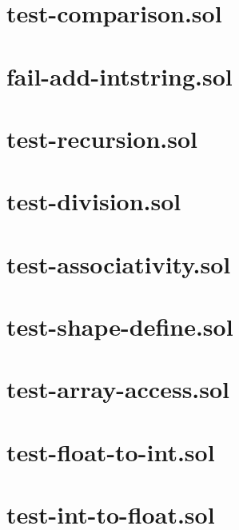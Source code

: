 \section{test-comparison.sol}


\section{fail-add-intstring.sol}


\section{test-recursion.sol}


\section{test-division.sol}


\section{test-associativity.sol}


\section{test-shape-define.sol}


\section{test-array-access.sol}


\section{test-float-to-int.sol}


\section{test-int-to-float.sol}


